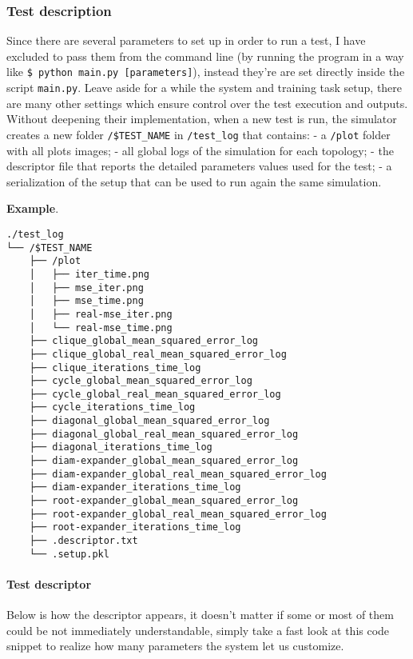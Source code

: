 \documentclass[11pt]{article}
\begin{document}
    \subsubsection{Test description}\label{test-description}

Since there are several parameters to set up in order to run a test, I
have excluded to pass them from the command line (by running the program
in a way like \texttt{\$\ python\ main.py\ {[}parameters{]}}), instead
they're are set directly inside the script \texttt{main.py}. Leave aside
for a while the system and training task setup, there are many other
settings which ensure control over the test execution and outputs.
Without deepening their implementation, when a new test is run, the
simulator creates a new folder \texttt{/\$TEST\_NAME} in
\texttt{/test\_log} that contains: - a \texttt{/plot} folder with all
plots images; - all global logs of the simulation for each topology; -
the descriptor file that reports the detailed parameters values used for
the test; - a serialization of the setup that can be used to run again
the same simulation.

\textbf{Example}.

\begin{verbatim}
./test_log
└── /$TEST_NAME
    ├── /plot
    │   ├── iter_time.png
    │   ├── mse_iter.png
    │   ├── mse_time.png
    │   ├── real-mse_iter.png
    │   └── real-mse_time.png
    ├── clique_global_mean_squared_error_log
    ├── clique_global_real_mean_squared_error_log
    ├── clique_iterations_time_log
    ├── cycle_global_mean_squared_error_log
    ├── cycle_global_real_mean_squared_error_log
    ├── cycle_iterations_time_log
    ├── diagonal_global_mean_squared_error_log
    ├── diagonal_global_real_mean_squared_error_log
    ├── diagonal_iterations_time_log
    ├── diam-expander_global_mean_squared_error_log
    ├── diam-expander_global_real_mean_squared_error_log
    ├── diam-expander_iterations_time_log
    ├── root-expander_global_mean_squared_error_log
    ├── root-expander_global_real_mean_squared_error_log
    ├── root-expander_iterations_time_log
    ├── .descriptor.txt
    └── .setup.pkl
\end{verbatim}

\paragraph{Test descriptor}\label{test-descriptor}

Below is how the descriptor appears, it doesn't matter if some or most
of them could be not immediately understandable, simply take a fast look
at this code snippet to realize how many parameters the system let us
customize.
\end{document}
